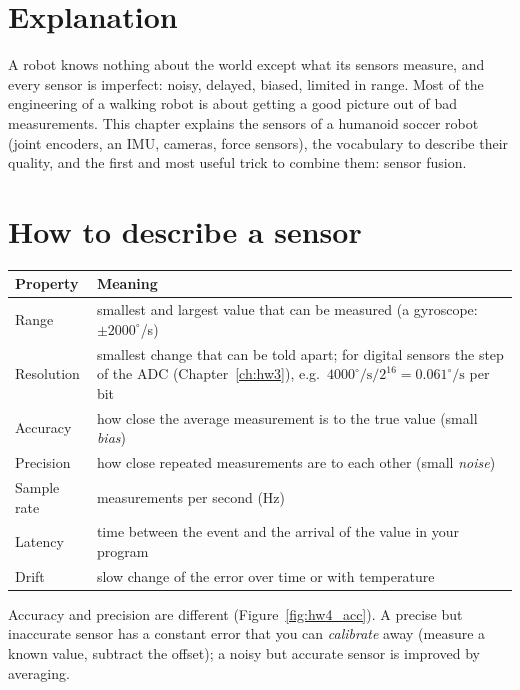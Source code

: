 \label{ch:hw4}

\section*{Explanation}
A robot knows nothing about the world except what its sensors measure, and every sensor is imperfect: noisy, delayed, biased, limited in range. Most of the engineering of a walking robot is about getting a good picture out of bad measurements. This chapter explains the sensors of a humanoid soccer robot (joint encoders, an IMU, cameras, force sensors), the vocabulary to describe their quality, and the first and most useful trick to combine them: sensor fusion.

\section*{How to describe a sensor}
\begin{center}
\renewcommand{\arraystretch}{1.25}
\begin{tabular}{p{3.0cm}p{10.0cm}}
\textbf{Property} & \textbf{Meaning}\\ \hline
Range & smallest and largest value that can be measured (a gyroscope: $\pm2000^\circ$/s)\\
Resolution & smallest change that can be told apart; for digital sensors the step of the ADC (Chapter~\ref{ch:hw3}), e.g.\ $4000^\circ/\text{s}/2^{16}=0.061^\circ/\text{s}$ per bit\\
Accuracy & how close the average measurement is to the true value (small \emph{bias})\\
Precision & how close repeated measurements are to each other (small \emph{noise})\\
Sample rate & measurements per second (Hz)\\
Latency & time between the event and the arrival of the value in your program\\
Drift & slow change of the error over time or with temperature\\
\end{tabular}
\end{center}
Accuracy and precision are different (Figure~\ref{fig:hw4_acc}). A precise but inaccurate sensor has a constant error that you can \emph{calibrate} away (measure a known value, subtract the offset); a noisy but accurate sensor is improved by averaging.
